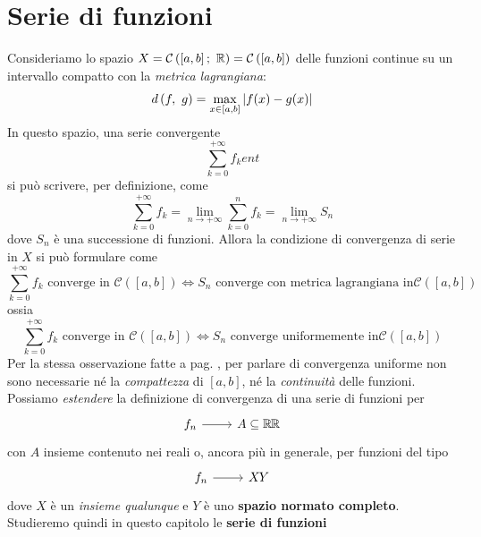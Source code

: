 \section{Serie di funzioni}
Consideriamo lo spazio  $X=\mathcal{C}\left(\left[a,b\right];\ \realset\right)=\mathcal{C}\left(\left[a,b\right]\right)$ delle funzioni continue su un intervallo compatto con la \textit{metrica lagrangiana}:
\begin{equation*}
	d\left(f,\ g\right)=\max_{x\in\left[a,b\right]}\abs{f(x)-g(x)}
\end{equation*}
In questo spazio, una serie convergente
\begin{equation*}
	\sum_{k=0}^{+\infty}f_kent
\end{equation*}
si può scrivere, per definizione, come
\begin{equation*}
	\sum_{k=0}^{+\infty}f_k=\lim_{n\to+\infty}\sum_{k=0}^{n}f_k=\lim_{n\to+\infty}S_n
\end{equation*}
dove $S_n$ è una successione di funzioni. Allora la condizione di convergenza di serie in $X$ si può formulare come
\begin{equation*}
	\sum_{k=0}^{+\infty}f_k\text{ converge in }\mathcal{C}\left(\left[a,b\right]\right)\iff S_n\text{ converge con metrica lagrangiana in}\mathcal{C}\left(\left[a,b\right]\right)
\end{equation*}
ossia
\begin{equation*}
	\sum_{k=0}^{+\infty}f_k\text{ converge in }\mathcal{C}\left(\left[a,b\right]\right)\iff S_n\text{ converge uniformemente in}\mathcal{C}\left(\left[a,b\right]\right)
\end{equation*}
Per la stessa osservazione fatte a pag. \pageref{convergenzalagrangianaeuniforme}, per parlare di convergenza uniforme non sono necessarie né la \textit{compattezza} di $\left[a,b\right]$, né la \textit{continuità} delle funzioni.\\
Possiamo \textit{estendere} la definizione di convergenza di una serie di funzioni per
\begin{equation*}
	\funz{f_n}{A\subseteq \realset}{\realset}
\end{equation*}
con $A$ insieme contenuto nei reali o, ancora più in generale, per funzioni del tipo
\begin{equation*}
	\funz{f_n}{X}{Y}
\end{equation*}
dove $X$ è un \textit{insieme qualunque} e $Y$ è uno \textbf{spazio normato completo}.\\
Studieremo quindi in questo capitolo le \textbf{serie di funzioni}
